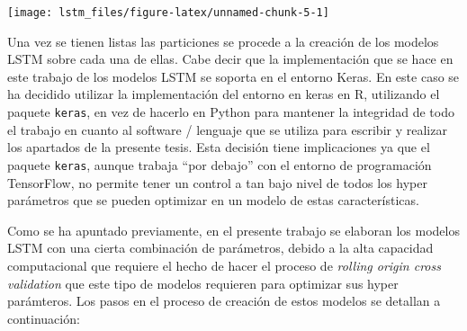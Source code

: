 \documentclass[]{article}
\begin{document}
\begin{center}\texttt{[image: lstm\_files/figure-latex/unnamed-chunk-5-1]} \end{center}
\centering

\setlength\parskip{5ex}
\justifying

Una vez se tienen listas las particiones se procede a la creación de los
modelos LSTM sobre cada una de ellas. Cabe decir que la implementación
que se hace en este trabajo de los modelos LSTM se soporta en el entorno
Keras. En este caso se ha decidido utilizar la implementación del
entorno en keras en R, utilizando el paquete \texttt{keras}, en vez de
hacerlo en Python para mantener la integridad de todo el trabajo en
cuanto al software / lenguaje que se utiliza para escribir y realizar
los apartados de la presente tesis. Esta decisión tiene implicaciones ya
que el paquete \texttt{keras}, aunque trabaja ``por debajo'' con el
entorno de programación TensorFlow, no permite tener un control a tan
bajo nivel de todos los hyper parámetros que se pueden optimizar en un
modelo de estas características.

Como se ha apuntado previamente, en el presente trabajo se elaboran los
modelos LSTM con una cierta combinación de parámetros, debido a la alta
capacidad computacional que requiere el hecho de hacer el proceso de
\emph{rolling origin cross validation} que este tipo de modelos
requieren para optimizar sus hyper parámteros. Los pasos en el proceso
de creación de estos modelos se detallan a continuación:
\end{document}
